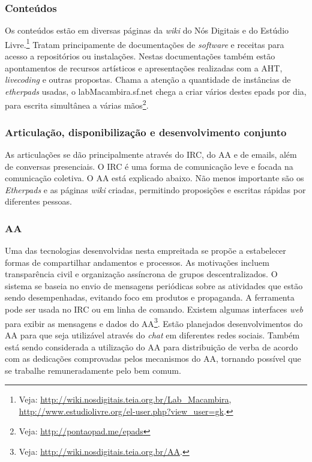       \subsubsection{Conteúdos}

      Os conteúdos estão em diversas páginas da \emph{wiki} do Nós Digitais e do Estúdio Livre.\footnote{Veja: \url{http://wiki.nosdigitais.teia.org.br/Lab_Macambira}, \url{http://www.estudiolivre.org/el-user.php?view_user=gk}.} Tratam principamente de documentações de \emph{software} e receitas para acesso a repositórios ou instalações. Nestas documentações também estão apontamentos de recursos artísticos e apresentações realizadas com a AHT, \emph{livecoding} e outras propostas. Chama a atenção a quantidade de instâncias de \emph{etherpads} usadas, o labMacambira.sf.net chega a criar vários destes epads por dia, para escrita simultânea a várias mãos\footnote{Veja: \url{http://pontaopad.me/epads}}.

      \subsubsection{Articulação, disponibilização e desenvolvimento conjunto}

As articulações se dão principalmente através do IRC, do AA e de emails, além de conversas presenciais. O IRC é uma forma de comunicação leve e focada na comunicação coletiva. O AA está explicado abaixo. Não menos importante são os \emph{Etherpads} e as páginas \emph{wiki} criadas, permitindo proposições e escritas rápidas por diferentes pessoas.


\subsubsection{AA}

Uma das tecnologias desenvolvidas nesta empreitada se propõe a estabelecer formas de compartilhar andamentos e processos. As motivações incluem transparência civil e organização assíncrona de grupos descentralizados. O sistema se baseia no envio de mensagens periódicas sobre as atividades que estão sendo desempenhadas, evitando foco em produtos e propaganda. A ferramenta pode ser usada no IRC ou em linha de comando. Existem algumas interfaces \emph{web} para exibir as mensagens e dados do AA\footnote{Veja: \url{http://wiki.nosdigitais.teia.org.br/AA}.}. Estão planejados desenvolvimentos do AA para que seja utilizável através do \emph{chat} em diferentes redes sociais. Também está sendo considerada a utilização do AA para distribuição de verba de acordo com as dedicações comprovadas pelos mecanismos do AA, tornando possível que se trabalhe remuneradamente pelo bem comum.
